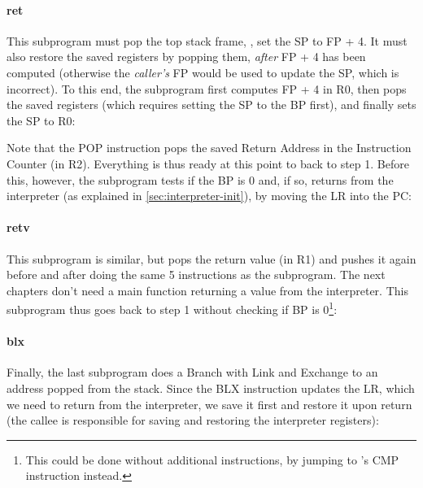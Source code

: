 
\paragraph{ret} This subprogram must pop the top stack frame, \ie, set the SP
to FP + 4. It must also restore the saved registers by popping them, {\em
after} FP + 4 has been computed (otherwise the {\em caller's} FP would be used
to update the SP, which is incorrect). To this end, the subprogram first
computes FP + 4 in R0, then pops the saved registers (which requires setting
the SP to the BP first), and finally sets the SP to R0:


\noindent Note that the POP instruction pops the saved Return Address in the
Instruction Counter (in R2). Everything is thus ready at this point to back to
step 1. Before this, however, the subprogram tests if the BP is 0 and, if so,
returns from the interpreter (as explained in \cref{sec:interpreter-init}), by
moving the LR into the PC:


\paragraph{retv} This subprogram is similar, but pops the return value (in R1)
and pushes it again before and after doing the same 5 instructions as the
 subprogram. The next chapters don't need a main function returning
a value from the interpreter. This subprogram thus goes back to step 1 without
checking if BP is 0\footnote{This could be done without additional
instructions, by jumping to 's CMP instruction instead.}:


\paragraph{blx} Finally, the last subprogram does a Branch with Link and
Exchange to an address popped from the stack. Since the BLX instruction updates
the LR, which we need to return from the interpreter, we save it first and
restore it upon return (the callee is responsible for saving and restoring the
interpreter registers):


